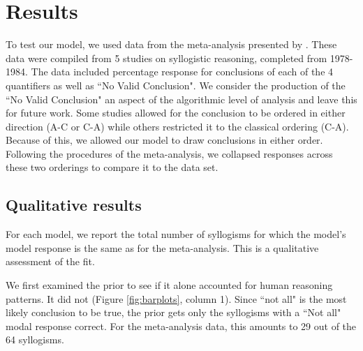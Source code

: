 \documentclass[10pt,letterpaper]{article}
\begin{document}
\section{Results}

To test our model, we used data from the meta-analysis presented by . These data were compiled from 5 studies on syllogistic reasoning, completed from 1978-1984. The data included percentage response for conclusions of each of the 4 quantifiers as well as ``No Valid Conclusion". We consider the production of the ``No Valid Conclusion" an aspect of the algorithmic level of analysis and leave this for future work. Some studies allowed for the conclusion to be ordered in either direction (A-C or C-A) while others restricted it to the classical ordering (C-A). Because of this, we allowed our model to draw conclusions in either order. Following the procedures of the meta-analysis, we collapsed responses across these two orderings to compare it to the data set.

\subsection{Qualitative results}
For each model, we report the total number of syllogisms for which the model's model response is the same as for the meta-analysis. This is a qualitative assessment of the fit. 

We first examined the prior to see if it alone accounted for human reasoning patterns. It did not (Figure \ref{fig:barplots}, column 1). Since ``not all" is the most likely conclusion to be true, the prior gets only the syllogisms with a ``Not all" modal response correct. For the meta-analysis data, this amounts to 29 out of the 64 syllogisms.
\end{document}
